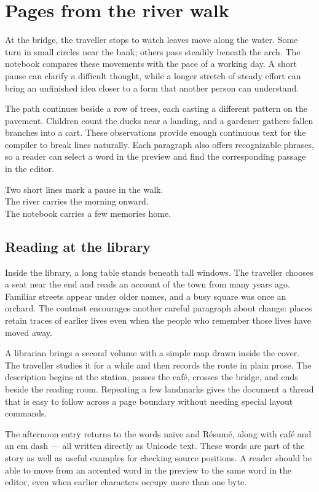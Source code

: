 \section{Pages from the river walk}
At the bridge, the traveller stops to watch leaves move along the water. Some turn in small circles near the bank; others pass steadily beneath the arch. The notebook compares these movements with the pace of a working day. A short pause can clarify a difficult thought, while a longer stretch of steady effort can bring an unfinished idea closer to a form that another person can understand.

The path continues beside a row of trees, each casting a different pattern on the pavement. Children count the ducks near a landing, and a gardener gathers fallen branches into a cart. These observations provide enough continuous text for the compiler to break lines naturally. Each paragraph also offers recognizable phrases, so a reader can select a word in the preview and find the corresponding passage in the editor.

Two short lines mark a pause in the walk.\\
The river carries the morning onward.\\
The notebook carries a few memories home.

\subsection{Reading at the library}
Inside the library, a long table stands beneath tall windows. The traveller chooses a seat near the end and reads an account of the town from many years ago. Familiar streets appear under older names, and a busy square was once an orchard. The contrast encourages another careful paragraph about change: places retain traces of earlier lives even when the people who remember those lives have moved away.

A librarian brings a second volume with a simple map drawn inside the cover. The traveller studies it for a while and then records the route in plain prose. The description begins at the station, passes the café, crosses the bridge, and ends beside the reading room. Repeating a few landmarks gives the document a thread that is easy to follow across a page boundary without needing special layout commands.

The afternoon entry returns to the words naïve and Résumé, along with café and an em dash — all written directly as Unicode text. These words are part of the story as well as useful examples for checking source positions. A reader should be able to move from an accented word in the preview to the same word in the editor, even when earlier characters occupy more than one byte.

